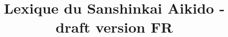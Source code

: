 \documentclass{memoir}
\begin{document}
\title{Lexique du Sanshinkai Aikido - draft version FR}
\maketitle


\end{document}
